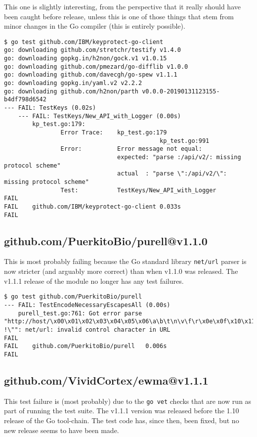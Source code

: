 \documentclass[a4paper]{paper}
\begin{document}
This one is slightly interesting, from the perspective that it really
should have been caught before release, unless this is one of those
things that stem from minor changes in the Go compiler (this is
entirely possible).

\begin{verbatim}
$ go test github.com/IBM/keyprotect-go-client       
go: downloading github.com/stretchr/testify v1.4.0
go: downloading gopkg.in/h2non/gock.v1 v1.0.15
go: downloading github.com/pmezard/go-difflib v1.0.0
go: downloading github.com/davecgh/go-spew v1.1.1
go: downloading gopkg.in/yaml.v2 v2.2.2
go: downloading github.com/h2non/parth v0.0.0-20190131123155-b4df798d6542
--- FAIL: TestKeys (0.02s)
    --- FAIL: TestKeys/New_API_with_Logger (0.00s)
        kp_test.go:179: 
            	Error Trace:	kp_test.go:179
            	            				kp_test.go:991
            	Error:      	Error message not equal:
            	            	expected: "parse :/api/v2/: missing protocol scheme"
            	            	actual  : "parse \":/api/v2/\": missing protocol scheme"
            	Test:       	TestKeys/New_API_with_Logger
FAIL
FAIL	github.com/IBM/keyprotect-go-client	0.033s
FAIL
\end{verbatim}

\subsection{github.com/PuerkitoBio/purell@v1.1.0}

This is most probably failing because the Go standard library {\tt net/url}
parser is now stricter (and arguably more correct) than when v1.1.0
was released. The v1.1.1 release of the module no longer has any test
failures.

\begin{verbatim}
$ go test github.com/PuerkitoBio/purell       
--- FAIL: TestEncodeNecessaryEscapesAll (0.00s)
    purell_test.go:761: Got error parse "http://host/\x00\x01\x02\x03\x04\x05\x06\a\b\t\n\v\f\r\x0e\x0f\x10\x11\x12\x13\x14\x15\x16\x17\x18\x19\x1a\x1b\x1c\x1d\x1e\x1f !\"": net/url: invalid control character in URL
FAIL
FAIL	github.com/PuerkitoBio/purell	0.006s
FAIL
\end{verbatim}

\subsection{github.com/VividCortex/ewma@v1.1.1}

This test failure is (most probably) due to the {\tt go vet} checks
that are now run as part of running the test suite. The v1.1.1 version
was released before the 1.10 release of the Go tool-chain. The test
code has, since then, been fixed, but no new release seems to have
been made.
\end{document}
